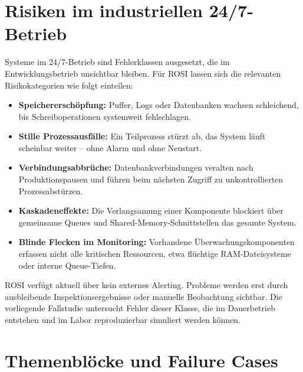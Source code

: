 
\section{Risiken im industriellen 24/7-Betrieb}

Systeme im 24/7-Betrieb sind Fehlerklassen ausgesetzt, die im Entwicklungsbetrieb unsichtbar bleiben. Für ROSI lassen sich die
relevanten Risikokategorien wie folgt einteilen:

\begin{itemize}
    \item \textbf{Speichererschöpfung:} Puffer, Logs oder Datenbanken wachsen schleichend,
    bis Schreiboperationen systemweit fehlschlagen.

    \item \textbf{Stille Prozessausfälle:} Ein Teilprozess stürzt ab, das System läuft scheinbar
    weiter -- ohne Alarm und ohne Neustart.

    \item \textbf{Verbindungsabbrüche:} Datenbankverbindungen veralten nach Produktionspausen
    und führen beim nächsten Zugriff zu unkontrollierten Prozessabstürzen.

    \item \textbf{Kaskadeneffekte:} Die Verlangsamung einer Komponente blockiert über gemeinsame
    Queues und Shared-Memory-Schnittstellen das gesamte System.

    \item \textbf{Blinde Flecken im Monitoring:} Vorhandene Überwachungskomponenten erfassen
    nicht alle kritischen Ressourcen, etwa flüchtige RAM-Dateisysteme oder interne
    Queue-Tiefen.
\end{itemize}

ROSI verfügt aktuell über kein externes Alerting. Probleme werden erst durch ausbleibende
Inspektionsergebnisse oder manuelle Beobachtung sichtbar. Die vorliegende Fallstudie
untersucht Fehler dieser Klasse, die im Dauerbetrieb entstehen und im Labor
reproduzierbar simuliert werden können.

\section{Themenblöcke und Failure Cases}

